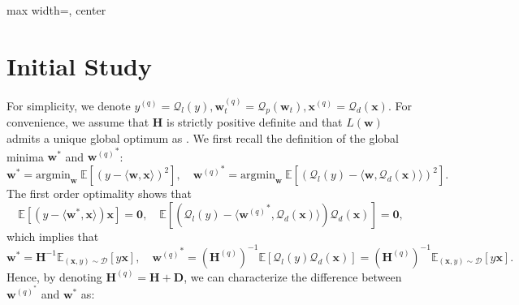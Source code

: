 \documentclass[11pt, letterpaper]{article}
\begin{document}
\begin{adjustbox}{max width=\textwidth, center}
\end{adjustbox}

\newpage

\section{Initial Study}
\label{Initial Study}
For simplicity, we denote ${y}^{(q)}=\mathcal{Q}_l({y}), \mathbf{w}_t^{(q)}=\mathcal{Q}_p(\mathbf{w}_t),\mathbf{x}^{(q)}=\mathcal{Q}_d(\mathbf{x})$. For convenience, we assume that $\mathbf{H}$ is strictly positive definite and that $L(\mathbf{w})$ admits a unique global optimum as \citet{zou2023benign}. We first recall the definition of the global minima $\mathbf{w}^*$ and ${\mathbf{w}^{(q)}}^*$:
\begin{equation*}
    {\mathbf{w}}^* = \mathrm{argmin}_\mathbf{w} \ \mathbb{E}\left[(y-\langle \mathbf{w},\mathbf{x}\rangle)^2\right], \quad {\mathbf{w}^{(q)}}^* = \mathrm{argmin}_\mathbf{w} \ \mathbb{E}\left[(\mathcal{Q}_l(y)-\langle \mathbf{w},\mathcal{Q}_d(\mathbf{x})\rangle)^2\right].
\end{equation*}
The first order optimality shows that
\begin{equation}
    \label{definition w*}\mathbb{E}[(y-\langle{\mathbf{w}}^*,\mathbf{x}\rangle)\mathbf{x}]=\mathbf{0},\quad \mathbb{E}[(\mathcal{Q}_l(y)-\langle{\mathbf{w}^{(q)}}^*,\mathcal{Q}_d(\mathbf{x})\rangle)\mathcal{Q}_d(\mathbf{x})]=\mathbf{0},
\end{equation}
which implies that
\begin{equation*}
    \mathbf{w}^*=\mathbf{H}^{-1}\mathbb{E}_{(\mathbf{x},y)\sim\mathcal{D}}[y\mathbf{x}], \quad {\mathbf{w}^{(q)}}^*=(\mathbf{H}^{(q)})^{-1}\mathbb{E}\left[\mathcal{Q}_l(y)\mathcal{Q}_d(\mathbf{x})\right]=(\mathbf{H}^{(q)})^{-1}\mathbb{E}_{(\mathbf{x},y)\sim\mathcal{D}}[y\mathbf{x}].
\end{equation*}
Hence, by denoting $\mathbf{H}^{(q)}=\mathbf{H}+\mathbf{D}$, we can characterize the difference between $\mathbf{w}^{(q)^*}$ and $\mathbf{w}^*$ as:
\end{document}
